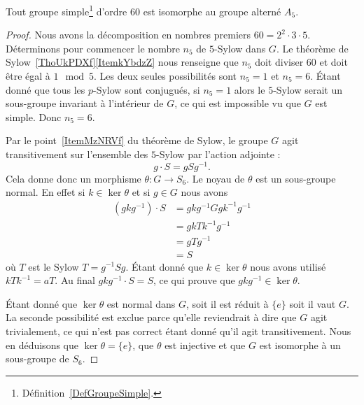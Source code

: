 \begin{proposition}        \label{PROPooUBIWooTrfCat}
	Tout groupe simple\footnote{Définition~\ref{DefGroupeSimple}.} d'ordre \( 60\) est isomorphe au groupe alterné \( A_5\).
\end{proposition}

\begin{proof}
	Nous avons la décomposition en nombres premiers \( 60=2^2\cdot 3\cdot 5\). Déterminons pour commencer le nombre \( n_5\) de \( 5\)-Sylow dans \( G\). Le théorème de Sylow~\ref{ThoUkPDXf}\ref{ItemkYbdzZ} nous renseigne que \( n_5\) doit diviser \( 60\) et doit être égal à \( 1\mod 5\). Les deux seules possibilités sont \( n_5=1\) et \( n_5=6\). Étant donné que tous les \( p\)-Sylow sont conjugués, si \( n_5=1\) alors le \( 5\)-Sylow serait un sous-groupe invariant à l'intérieur de $G$, ce qui est impossible vu que \( G\) est simple. Donc \( n_5=6\).

	Par le point~\ref{ItemMzNRVf} du théorème de Sylow, le groupe \( G\) agit transitivement sur l'ensemble des \( 5\)-Sylow par l'action adjointe :
	\begin{equation}
		g\cdot S=gSg^{-1}.
	\end{equation}
	Cela donne donc un morphisme \( \theta\colon G\to S_6\). Le noyau de \( \theta\) est un sous-groupe normal. En effet si \( k\in \ker\theta\) et si \( g\in G\) nous avons
	\begin{subequations}
		\begin{align}
			(gkg^{-1})\cdot S & =gkg^{-1} Ggk^{-1}g^{-1} \\
			                  & =gkTk^{-1}g^{-1}         \\
			                  & =gTg^{-1}                \\
			                  & =S
		\end{align}
	\end{subequations}
	où \( T\) est le Sylow \( T=g^{-1}Sg\). Étant donné que \( k\in \ker\theta\) nous avons utilisé \( kTk^{-1}=aT\). Au final \( gkg^{-1}\cdot S=S\), ce qui prouve que \( gkg^{-1} \in\ker\theta\).

	Étant donné que \( \ker\theta\) est normal dans \( G\), soit il est réduit à \( \{ e \}\) soit il vaut \( G\). La seconde possibilité est exclue parce qu'elle reviendrait à dire que \( G\) agit trivialement, ce qui n'est pas correct étant donné qu'il agit transitivement. Nous en déduisons que \( \ker\theta=\{ e \}\), que \( \theta\) est injective et que \( G\) est isomorphe à un sous-groupe de \( S_6\).


\end{proof}
